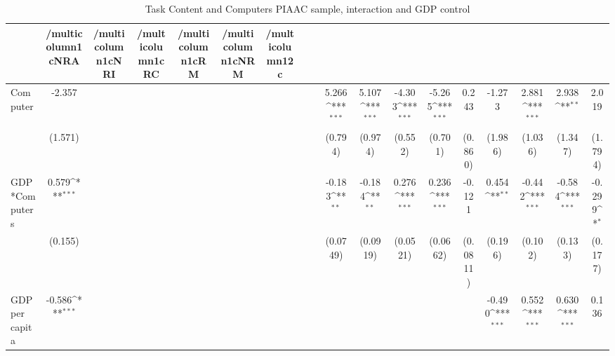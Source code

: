 \begin{table}[htbp]\centering
\def\sym#1{\ifmmode^{#1}\else\(^{#1}\)\fi}
\caption{Task Content and Computers PIAAC sample, interaction and GDP control }
\begin{tabular}{l*{17}{c}}
\hline\hline
            &/multicolumn{1}{c}{NRA}&/multicolumn{1}{c}{NRI}&/multicolumn{1}{c}{RC}&/multicolumn{1}{c}{RM}&/multicolumn{1}{c}{NRM}&/multicolumn{12}{c}{}                                                                                                                                                                                                                                                  \\
\hline
Computer    &      -2.357         &                     &                     &                     &                     &                     &                     &                     &       5.266\sym{***}&       5.107\sym{***}&      -4.303\sym{***}&      -5.265\sym{***}&       0.243         &      -1.273         &       2.881\sym{***}&       2.938\sym{**} &       2.019         \\
            &     (1.571)         &                     &                     &                     &                     &                     &                     &                     &     (0.794)         &     (0.974)         &     (0.552)         &     (0.701)         &     (0.860)         &     (1.986)         &     (1.036)         &     (1.347)         &     (1.794)         \\
[1em]
GDP*Computers&       0.579\sym{***}&                     &                     &                     &                     &                     &                     &                     &      -0.183\sym{**} &      -0.184\sym{**} &       0.276\sym{***}&       0.236\sym{***}&      -0.121         &       0.454\sym{**} &      -0.442\sym{***}&      -0.584\sym{***}&      -0.299\sym{*}  \\
            &     (0.155)         &                     &                     &                     &                     &                     &                     &                     &    (0.0749)         &    (0.0919)         &    (0.0521)         &    (0.0662)         &    (0.0811)         &     (0.196)         &     (0.102)         &     (0.133)         &     (0.177)         \\
[1em]
GDP per capita&      -0.586\sym{***}&                     &                     &                     &                     &                     &                     &                     &                     &                     &                     &                     &                     &      -0.490\sym{***}&       0.552\sym{***}&       0.630\sym{***}&       0.136         \\

\end{tabular}
\end{table}
